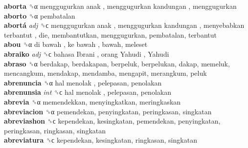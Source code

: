 \textbf{aborta} ␝α   menggugurkan anak ,  menggugurkan kandungan , menggugurkan  \\
\textbf{aborto} ␝α  pembatalan  \\
\textbf{abortá} \emph{adj}  ␝ϲ   menggugurkan anak ,  menggugurkan kandungan ,  menyebabkan terbantut , die, membantutkan, menggugurkan, pembatalan, terbantut  \\
\textbf{abou} ␝α   di bawah ,  ke bawah , bawah, meleset  \\
\textbf{abraiko} \emph{adj}  ␝ϲ   bahasa Ibrani ,  orang Yahudi ,  Yahudi   \\
\textbf{abraso} ␝α  berdakap, berdakapan, berpeluk, berpelukan, dakap, memeluk, mencangkum, mendakap, mendamba, mengapit, merangkum, peluk  \\
\textbf{abrenuncia} ␝α   hal menolak , pelepasan, penolakan  \\
\textbf{abrenunsia} \emph{int}  ␝ϲ   hal menolak , pelepasan, penolakan  \\
\textbf{abrevia} ␝α  memendekkan, menyingkatkan, meringkaskan  \\
\textbf{abreviacion} ␝α  pemendekan, penyingkatan, peringkasan, singkatan  \\
\textbf{abreviashon} ␝ϲ  kependekan, kesingkatan, pemendekan, penyingkatan, peringkasan, ringkasan, singkatan  \\
\textbf{abreviatura} ␝ϲ  kependekan, kesingkatan, ringkasan, singkatan  \\
